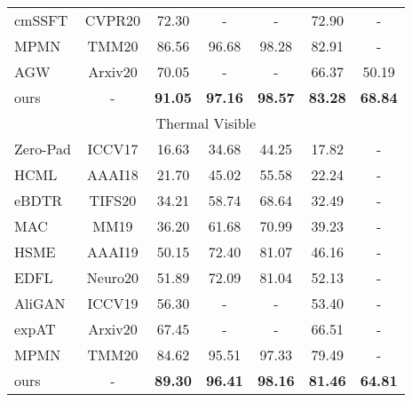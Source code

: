 \documentclass[journal]{IEEEtran}
\begin{document}
\begin{table}
\begin{tabular}{l|c|c|c|c|c|c}
      cmSSFT \cite{lu2020cross} & CVPR20 & 72.30 & - & - & 72.90 &-  \\
      MPMN \cite{Wang2020MPMN} & TMM20 & 86.56 & 96.68 & 98.28 & 82.91 & - \\
      AGW \cite{Ye2020DeepLF} & Arxiv20 & 70.05 & - & - & 66.37 & 50.19  \\ \hline
      ours & - & \textbf{91.05}  & \textbf{97.16} & \textbf{98.57} & \textbf{83.28} & \textbf{68.84} \\ \toprule[1pt] \toprule[1pt]
      \multicolumn{7}{c}{ Thermal  Visible} \\ \toprule[1pt]
      Zero-Pad \cite{wu2017rgb}& ICCV17 & 16.63 & 34.68 & 44.25 & 17.82 & - \\
      HCML\cite{ye2018hierarchical} & AAAI18 & 21.70 & 45.02 & 55.58 & 22.24 & -\\
      eBDTR \cite{Ye2020DeepLF} & TIFS20 & 34.21 & 58.74 & 68.64 & 32.49 & - \\
      MAC \cite{Ye2019ModalityawareCL} & MM19 & 36.20 & 61.68 & 70.99 & 39.23 & - \\
      HSME \cite{hao2019hsme} & AAAI19  & 50.15 & 72.40 & 81.07 & 46.16 & - \\
      EDFL \cite{liu2020enhancing} & Neuro20 & 51.89 & 72.09 & 81.04 & 52.13 & - \\
      AliGAN \cite{wang2019rgb} & ICCV19 & 56.30 & - & - & 53.40 & - \\
      expAT \cite{Ye2020BidirectionalEA} & Arxiv20 & 67.45 & - & - & 66.51 & - \\
      MPMN \cite{Wang2020MPMN} & TMM20 & 84.62 & 95.51 & 97.33 & 79.49 & - \\ \hline
      ours & - & \textbf{89.30}  & \textbf{96.41} & \textbf{98.16} & \textbf{81.46} & \textbf{64.81} \\
      \toprule[2pt]
  \end{tabular}
\end{table}
\end{document}
